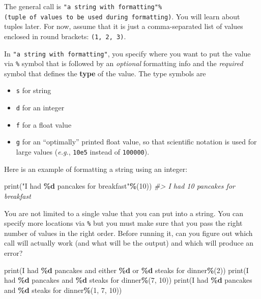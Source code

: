 \documentclass[
]{book}
\newenvironment{Shaded}{\begin{snugshade}}{\end{snugshade}}
\newcommand{\BuiltInTok}[1]{#1}
\newcommand{\CommentTok}[1]{\textcolor[rgb]{0.56,0.35,0.01}{\textit{#1}}}
\newcommand{\DecValTok}[1]{\textcolor[rgb]{0.00,0.00,0.81}{#1}}
\newcommand{\NormalTok}[1]{#1}
\newcommand{\OperatorTok}[1]{\textcolor[rgb]{0.81,0.36,0.00}{\textbf{#1}}}
\newcommand{\SpecialCharTok}[1]{\textcolor[rgb]{0.81,0.36,0.00}{\textbf{#1}}}
\newcommand{\StringTok}[1]{\textcolor[rgb]{0.31,0.60,0.02}{#1}}
\providecommand{\tightlist}{%
  \setlength{\itemsep}{0pt}\setlength{\parskip}{0pt}}
\begin{document}
The general call is \texttt{"a\ string\ with\ formatting"\%(tuple\ of\ values\ to\ be\ used\ during\ formatting)}. You will learn about tuples later. For now, assume that it is just a comma-separated list of values enclosed in round brackets: \texttt{(1,\ 2,\ 3)}.

In \texttt{"a\ string\ with\ formatting"}, you specify where you want to put the value via \texttt{\%} symbol that is followed by an \emph{optional} formatting info and the \emph{required} symbol that defines the \textbf{type} of the value. The type symbols are

\begin{itemize}
\tightlist
\item
  \texttt{s} for string
\item
  \texttt{d} for an integer
\item
  \texttt{f} for a float value
\item
  \texttt{g} for an ``optimally'' printed float value, so that scientific notation is used for large values (\emph{e.g.}, \texttt{10e5} instead of \texttt{100000}).
\end{itemize}

Here is an example of formatting a string using an integer:

\begin{Shaded}
\begin{Highlighting}[]
\BuiltInTok{print}\NormalTok{(}\StringTok{"I had }\SpecialCharTok{\%d}\StringTok{ pancakes for breakfast"}\OperatorTok{\%}\NormalTok{(}\DecValTok{10}\NormalTok{))}
\CommentTok{\#\textgreater{} I had 10 pancakes for breakfast}
\end{Highlighting}
\end{Shaded}

You are not limited to a single value that you can put into a string. You can specify more locations via \texttt{\%} but you must make sure that you pass the right number of values in the right order. Before running it, can you figure out which call will actually work (and what will be the output) and which will produce an error?

\begin{Shaded}
\begin{Highlighting}[]
\BuiltInTok{print}\NormalTok{(}\StringTok{\textquotesingle{}I had }\SpecialCharTok{\%d}\StringTok{ pancakes and either }\SpecialCharTok{\%d}\StringTok{  or }\SpecialCharTok{\%d}\StringTok{ steaks for dinner\textquotesingle{}}\OperatorTok{\%}\NormalTok{(}\DecValTok{2}\NormalTok{))}
\BuiltInTok{print}\NormalTok{(}\StringTok{\textquotesingle{}I had }\SpecialCharTok{\%d}\StringTok{ pancakes and }\SpecialCharTok{\%d}\StringTok{ steaks for dinner\textquotesingle{}}\OperatorTok{\%}\NormalTok{(}\DecValTok{7}\NormalTok{, }\DecValTok{10}\NormalTok{))}
\BuiltInTok{print}\NormalTok{(}\StringTok{\textquotesingle{}I had }\SpecialCharTok{\%d}\StringTok{ pancakes and }\SpecialCharTok{\%d}\StringTok{ steaks for dinner\textquotesingle{}}\OperatorTok{\%}\NormalTok{(}\DecValTok{1}\NormalTok{, }\DecValTok{7}\NormalTok{, }\DecValTok{10}\NormalTok{))}
\end{Highlighting}
\end{Shaded}
\end{document}
